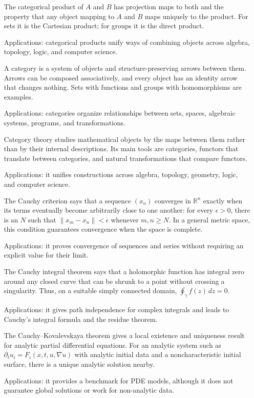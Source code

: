 The categorical product of $A$ and $B$ has projection maps to both and the property that any object mapping to $A$ and $B$ maps uniquely to the product. For sets it is the Cartesian product; for groups it is the direct product. \par\noindent Applications: categorical products unify ways of combining objects across algebra, topology, logic, and computer science.

A category is a system of objects and structure-preserving arrows between them. Arrows can be composed associatively, and every object has an identity arrow that changes nothing. Sets with functions and groups with homomorphisms are examples. \par\noindent Applications: categories organize relationships between sets, spaces, algebraic systems, programs, and transformations.

Category theory studies mathematical objects by the maps between them rather than by their internal descriptions. Its main tools are categories, functors that translate between categories, and natural transformations that compare functors. \par\noindent Applications: it unifies constructions across algebra, topology, geometry, logic, and computer science.

The Cauchy criterion says that a sequence $(x_n)$ converges in $\mathbb{R}^n$ exactly when its terms eventually become arbitrarily close to one another: for every $\epsilon>0$, there is an $N$ such that $\|x_m-x_n\|<\epsilon$ whenever $m,n\ge N$. In a general metric space, this condition guarantees convergence when the space is complete. \par\noindent Applications: it proves convergence of sequences and series without requiring an explicit value for their limit.

The Cauchy integral theorem says that a holomorphic function has integral zero around any closed curve that can be shrunk to a point without crossing a singularity. Thus, on a suitable simply connected domain, $\oint_\gamma f(z)\,dz=0$. \par\noindent Applications: it gives path independence for complex integrals and leads to Cauchy's integral formula and the residue theorem.

The Cauchy--Kovalevskaya theorem gives a local existence and uniqueness result for analytic partial differential equations. For an analytic system such as $\partial_tu_i=F_i(x,t,u,\nabla u)$ with analytic initial data and a noncharacteristic initial surface, there is a unique analytic solution nearby. \par\noindent Applications: it provides a benchmark for PDE models, although it does not guarantee global solutions or work for non-analytic data.

